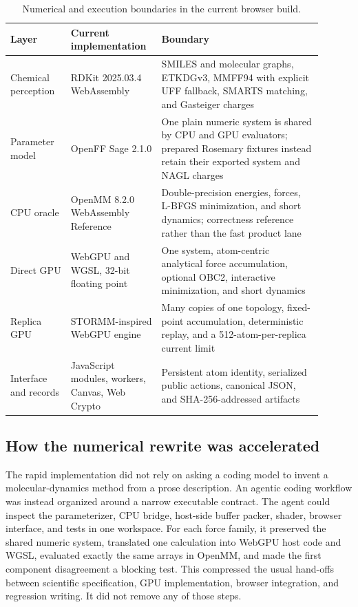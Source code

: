 \begin{table}[htbp]
  \centering
  \caption{Numerical and execution boundaries in the current browser build.}
  \label{tab:architecture-runtime}
  \footnotesize
  \renewcommand{\arraystretch}{1.08}
  \begin{tabular}{@{}>{\raggedright\arraybackslash}p{0.18\linewidth}
                       >{\raggedright\arraybackslash}p{0.24\linewidth}
                       >{\raggedright\arraybackslash}p{0.48\linewidth}@{}}
    \toprule
    Layer & Current implementation & Boundary \\
    \midrule
    Chemical perception & RDKit 2025.03.4 WebAssembly &
      SMILES and molecular graphs, ETKDGv3, MMFF94 with explicit UFF fallback,
      SMARTS matching, and Gasteiger charges \\
    Parameter model & OpenFF Sage 2.1.0 &
      One plain numeric system is shared by CPU and GPU evaluators; prepared
      Rosemary fixtures instead retain their exported system and NAGL charges \\
    CPU oracle & OpenMM 8.2.0 WebAssembly Reference &
      Double-precision energies, forces, L-BFGS minimization, and short
      dynamics; correctness reference rather than the fast product lane \\
    Direct GPU & WebGPU and WGSL, 32-bit floating point &
      One system, atom-centric analytical force accumulation, optional OBC2,
      interactive minimization, and short dynamics \\
    Replica GPU & STORMM-inspired WebGPU engine &
      Many copies of one topology, fixed-point accumulation, deterministic
      replay, and a 512-atom-per-replica current limit \\
    Interface and records & JavaScript modules, workers, Canvas, Web Crypto &
      Persistent atom identity, serialized public actions, canonical JSON, and
      SHA-256-addressed artifacts \\
    \bottomrule
  \end{tabular}
\end{table}

\subsection{How the numerical rewrite was accelerated}
\label{app:agent-development}

The rapid implementation did not rely on asking a coding model to invent a
molecular-dynamics method from a prose description.
An agentic coding workflow was instead organized around a narrow executable
contract.
The agent could inspect the parameterizer, CPU bridge, host-side buffer packer,
shader, browser interface, and tests in one workspace.
For each force family, it preserved the shared numeric system, translated one
calculation into WebGPU host code and WGSL, evaluated exactly the same arrays in
OpenMM, and made the first component disagreement a blocking test.
This compressed the usual hand-offs between scientific specification, GPU
implementation, browser integration, and regression writing.
It did not remove any of those steps.

